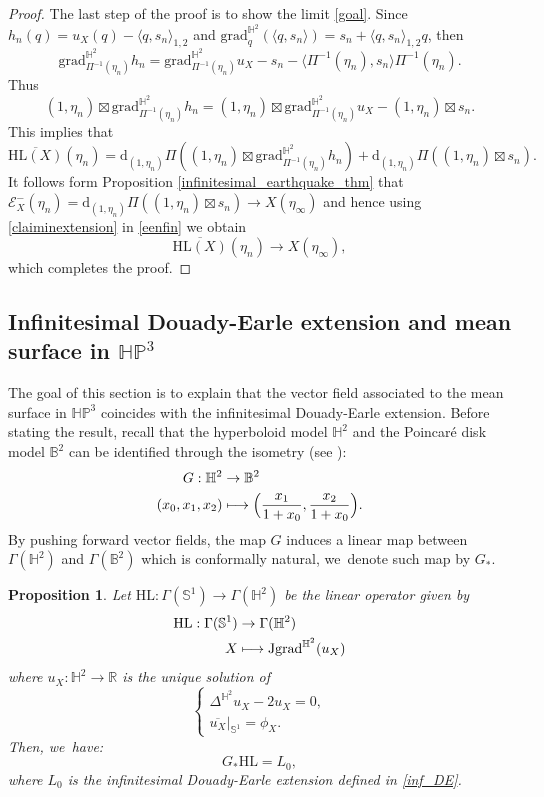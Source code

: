 \documentclass[11pt]{article}
\newcommand{\Subsection}{\subsection}
\newcommand\mto{\mathchoice{\longmapsto}{\mapsto}{\mapsto}{\mapsto}}
\theoremstyle{plain}
\newtheorem{prop}[cor]{Proposition}
\theoremstyle{definition}
\newcommand{\HP}{\mathbb{HP}^3}
\newcommand{\grad}{\mathrm{grad}^{\mathbb{H}^2}}
\newcommand{\J}{\mathrm{J}}
\newcommand{\inner}[1] {\langle #1 \rangle}
\begin{document}
\begin{proof}
The last step of the proof is to show the limit \eqref{goal}. Since $h_n(q)=u_X(q)-\inner{q,s_n}_{1,2}$ and $\grad_q(\inner{q,s_n})=s_n+\inner{q,s_n}_{1,2}q$, then
\[
\grad_{\Pi^{-1}(\eta_n)}h_n=\grad_{\Pi^{-1}(\eta_n)}u_X-s_n-\inner{\Pi^{-1}(\eta_n),s_n}\Pi^{-1}(\eta_n).
\]
Thus
\[
(1,\eta_n)\boxtimes\grad_{\Pi^{-1}(\eta_n)}h_n=(1,\eta_n)\boxtimes\grad_{\Pi^{-1}(\eta_n)}u_X-(1,\eta_n)\boxtimes s_n.
\]
This implies that
\begin{equation}\label{eenfin}
\overline{\mathrm{HL}(X)}(\eta_n)=\mathrm{d}_{(1,\eta_n)}\Pi\left((1,\eta_n)\boxtimes\grad_{\Pi^{-1}(\eta_n)} h_n \right)+\mathrm{d}_{(1,\eta_n)}\Pi((1,\eta_n)\boxtimes s_n).
\end{equation}
It follows form Proposition \ref{infinitesimal_earthquake_thm} that $ \mathcal{E}^-_X(\eta_n)=\mathrm{d}_{(1,\eta_n)}\Pi\left((1,\eta_n)\boxtimes s_n\right)\to X(\eta_{\infty})$ and hence using \eqref{claiminextension} in \eqref{eenfin} we obtain
\[
\overline{\mathrm{HL}(X)}(\eta_n)\to X(\eta_{\infty}),
\]
which completes the proof.
\end{proof}

\Subsection{Infinitesimal Douady-Earle extension and mean surface in \texorpdfstring{$\HP$}{HP}}
The goal of this section is to explain that the vector field associated to the mean surface in $\HP$ coincides with the infinitesimal Douady-Earle extension. Before stating the result, recall that the hyperboloid model $\mathbb{H}^2$ and the Poincaré disk model $\mathbb{B}^2$ can be identified through the isometry (see \cite[Chap.\,2]{martelli2022introduction}):
\begin{equation}\label{H2_to_B2}
\begin{aligned}
G : \mathbb{H}^2 & \to \mathbb{B}^2 \\
(x_0,x_1,x_2) & \mto \Bigl(\frac{x_1}{1+x_0}, \frac{x_2}{1+x_0}\Bigr).
\end{aligned}
\end{equation}
By pushing forward vector fields, the map $G$ induces a linear map between $\Gamma(\mathbb{H}^2)$ and $\Gamma(\mathbb{B}^2)$ which is conformally natural, we~denote such map by $G_*$.
\begin{prop}\label{HL_DE}
Let $\mathrm{HL}:\Gamma(\mathbb{S}^1)\to\Gamma(\mathbb{H}^2)$ be the linear operator given by
\[
\begin{aligned}
\mathrm{HL}: \Gamma(\mathbb{S}^1) & \to \Gamma(\mathbb{H}^2) \\
X & \mto\J\grad(u_X)
\end{aligned}
\]
where $u_X:\mathbb{H}^2\to\mathbb{R}$ is the unique solution of
\begin{equation}\label{platau_HPX}
\begin{cases}
\Delta^{\mathbb{H}^2} u_X-2u_X=0, \\
\overline{u_X}|_{\mathbb{S}^1}=\phi_X.
\end{cases}\end{equation}
Then, we~have:
\[
G_*\mathrm{HL}=L_0,
\]
where $L_0$ is the infinitesimal Douady-Earle extension defined in \eqref{inf_DE}.
\end{prop}
\end{document}
